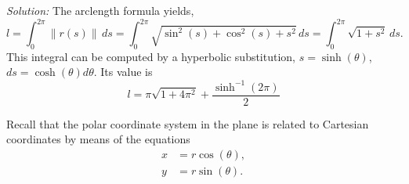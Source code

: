 \documentclass[11pt]{exam}
\begin{document}
\begin{questions}
\begin{parts}
\textit{Solution:} The arclength formula yields,
\begin{equation*}
l = \int_{0}^{2\pi} \|r(s)\| \, ds = \int_{0}^{2\pi} \sqrt{ \sin^2(s)+\cos^2(s)+s^2} \, ds = \int_{0}^{2\pi} \sqrt{ 1+s^2} \, ds.
\end{equation*}
This integral can be computed by a hyperbolic substitution, $s=\sinh(\theta)$, $ds=\cosh(\theta)d\theta$. Its value is 
\begin{equation*}
l = \pi\sqrt{1+4\pi^2} + \frac{\sinh^{-1}(2\pi)}{2}
\end{equation*}
\vfill
\end{parts}
\addpoints


\newpage
\addpoints
\question Recall that the polar coordinate system in the plane is related to Cartesian coordinates by means of the equations
\begin{align}
x & = r\cos(\theta), \\
y & = r\sin(\theta).
\end{align}
\end{questions}
\end{document}
